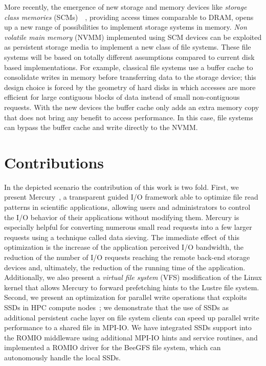 More recently, the emergence of new storage and memory devices like \textit{storage class memories} (SCMs)~\cite{Wang2013}~\cite{Zhang2015}, providing access times comparable to DRAM, opens up a new range of possibilities 
to implement storage systems in memory. \textit{Non volatile main memory} (NVMM) implemented using SCM devices can be exploited as persistent storage media to implement a new class of file systems. These file systems will be 
based on totally different assumptions compared to current disk based implementations. For example, classical file systems use a buffer cache to consolidate writes in memory before transferring data to the storage device; this 
design choice is forced by the geometry of hard disks in which accesses are more efficient for large contiguous blocks of data instead of small non-contiguous requests. With the new devices the buffer cache only adds an extra 
memory copy that does not bring any benefit to access performance. In this case, file systems can bypass the buffer cache and write directly to the NVMM.

\section{Contributions}
In the depicted scenario the contribution of this work is two fold. First, we present Mercury~\cite{Congiu2017}, a transparent guided I/O framework able to optimize file read patterns in scientific applications, 
allowing users and administrators to control the I/O behavior of their applications without modifying them. Mercury is especially helpful for converting numerous small read requests into a few larger requests using 
a technique called data sieving. The immediate effect of this optimization is the increase of the application perceived I/O bandwidth, the reduction of the number of I/O requests reaching the remote back-end storage 
devices and, ultimately, the reduction of the running time of the application. Additionally, we also present a \textit{virtual file system} (VFS) modification of the Linux kernel that allows Mercury to forward prefetching 
hints to the Lustre file system. Second, we present an optimization for parallel write operations that exploits SSDs in HPC compute nodes~\cite{Congiu2016}; we demonstrate that the use of SSDs as additional persistent 
cache layer on file system clients can speed up parallel write performance to a shared file in MPI-IO. We have integrated SSDs support into the ROMIO middleware using additional MPI-IO hints and service routines, and 
implemented a ROMIO driver for the BeeGFS file system, which can autonomously handle the local SSDs.

